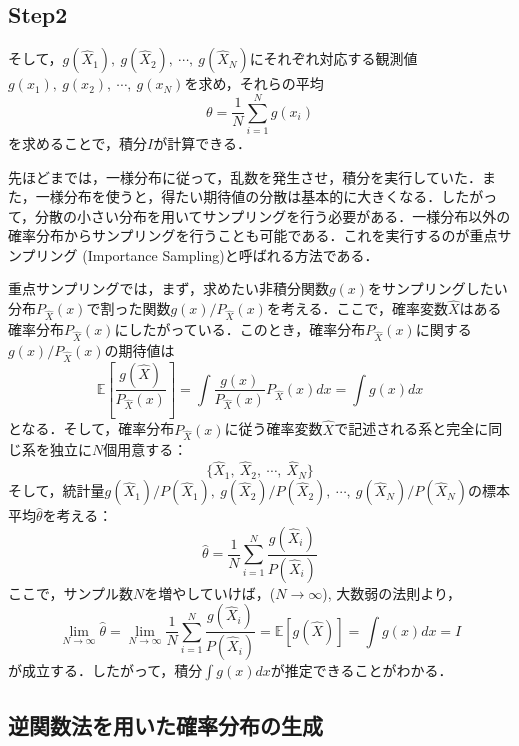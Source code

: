 \subsection*{Step2}
そして，$g(\hat{X}_1),\ g(\hat{X}_2),\ \cdots,\ g(\hat{X}_N)$にそれぞれ対応する観測値$g(x_1),\ g(x_2),\ \cdots,\ g(x_N)$を求め，それらの平均
\begin{equation}
    \theta = \frac{1}{N} \sum_{i=1}^{N} g(x_i)
\end{equation}
を求めることで，積分$I$が計算できる．

先ほどまでは，一様分布に従って，乱数を発生させ，積分を実行していた．また，一様分布を使うと，得たい期待値の分散は基本的に大きくなる．したがって，分散の小さい分布を用いてサンプリングを行う必要がある．一様分布以外の確率分布からサンプリングを行うことも可能である．これを実行するのが重点サンプリング (Importance Sampling)と呼ばれる方法である．

重点サンプリングでは，まず，求めたい非積分関数$g(x)$をサンプリングしたい分布$P_{\hat{X}}(x)$で割った関数$g(x) / P_{\hat{X}}(x)$を考える．ここで，確率変数$\hat{X}$はある確率分布$P_{\hat{X}}(x)$にしたがっている．このとき，確率分布$P_{\hat{X}}(x)$に関する$g(x) / P_{\hat{X}}(x)$の期待値は
\begin{equation}
    \mathbb{E}\left[
    \frac{g(\hat{X})}{P_{\hat{X}}(x)}
    \right]
    =\int \frac{g(x)}{P_{\hat{X}}(x)}P_{\hat{X}}(x)dx = \int g(x) dx
\end{equation}
となる．そして，確率分布$P_{\hat{X}}(x)$に従う確率変数$\hat{X}$で記述される系と完全に同じ系を独立に$N$個用意する：
\begin{equation}
    \{\hat{X}_1,\ \hat{X}_2,\ \cdots,\ \hat{X}_N \}
\end{equation}
そして，統計量$g(\hat{X}_1) / P(\hat{X}_1),\ g(\hat{X}_2)/ P(\hat{X}_2),\ \cdots,\ g(\hat{X}_N) / P(\hat{X}_N)$の標本平均$\hat{\theta}$を考える：
\begin{equation}
    \hat{\theta} = \frac{1}{N}\sum_{i=1}^{N} \frac{g(\hat{X}_i)}{P(\hat{X}_i)}
\end{equation}
ここで，サンプル数$N$を増やしていけば，($N\to\infty$), 大数弱の法則より，
\begin{equation}
    \lim_{N\to\infty}\hat{\theta} =  \lim_{N\to\infty}\frac{1}{N}\sum_{i=1}^{N} \frac{g(\hat{X}_i)}{P(\hat{X}_i)}
    =\mathbb{E}[g(\hat{X})]=\int g(x) dx=I
\end{equation}
が成立する．したがって，積分$\int g(x) dx$が推定できることがわかる．

\subsection{逆関数法を用いた確率分布の生成}


